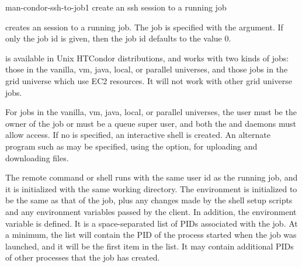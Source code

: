 \begin{ManPage}{}{man-condor-ssh-to-job}{1}
{create an ssh session to a running job}

\Synopsis {}

\ToolDebugOption
{}

\Description

 creates an  session to a running job.
The job is specified with the argument.
If only the job  id is given,
then the job  id defaults to the value 0.

 is available in Unix HTCondor distributions,
and works with two kinds of jobs: those in the vanilla, vm, java, local,
or parallel universes, and those jobs in the grid universe which use EC2
resources.  It will not work with other grid universe jobs.

For jobs in the vanilla, vm, java, local, or parallel universes,
the user must be the owner of the job or must be a queue super user, 
and both the  and  daemons
must allow  access.
If no  is specified, an interactive shell is created.
An alternate  program such as  may be specified,
using the  option, for uploading and downloading files.

The remote command or shell runs with the same user id as the running job,
and it is initialized with the same working directory.
The environment is initialized to be the same as that of the job,
plus any changes made by the shell setup scripts
and any environment variables passed by the  client.
In addition, the environment variable
 is defined.  
It is a space-separated list of PIDs associated with the job.
At a minimum, the list will contain the
PID of the process started when the job was launched,
and it will be the first item in the list.
It may contain additional PIDs of other processes that the job has created.


\end{ManPage}

